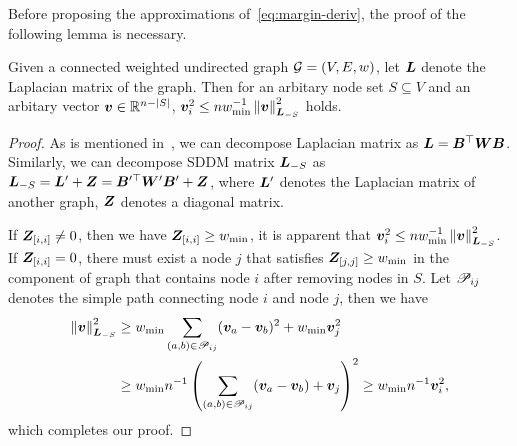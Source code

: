 \documentclass[sigconf]{acmart}
\begin{document}
Before proposing the approximations of~\eqref{eq:margin-deriv}, the proof of the following lemma is necessary.
\begin{lemma}\label{lem:norm-ineq}
  Given a connected weighted undirected graph \(\mathcal{G}=(V,E,w)\), let \(\boldsymbol{L}\) denote the Laplacian matrix of the graph.
  Then for an arbitary node set \(S\subseteq V\) and an arbitary vector \(\boldsymbol{v}\in\mathbb{R}^{n-\left|S \right|}\), \(\boldsymbol{v}_i^2\le nw_{\min}^{-1}\left\Vert\boldsymbol{v}\right\Vert^2_{\boldsymbol{L}_{-S}}\) holds.
\end{lemma}

\begin{proof}
  As is mentioned in~, we can decompose Laplacian matrix as \(\boldsymbol{L}=\boldsymbol{B}^\top\boldsymbol{W}\boldsymbol{B}\).
  Similarly, we can decompose SDDM matrix \(\boldsymbol{L}_{-S}\) as \(\boldsymbol{L}_{-S}=\boldsymbol{L}'+\boldsymbol{Z}=\boldsymbol{B}'^\top\boldsymbol{W}'\boldsymbol{B}'+\boldsymbol{Z}\), where \(\boldsymbol{L}'\) denotes the Laplacian matrix of another graph, \(\boldsymbol{Z}\) denotes a diagonal matrix.

  If \(\boldsymbol{Z}_{[i,i]}\neq0\), then we have \(\boldsymbol{Z}_{[i,i]}\ge w_{\min}\), it is apparent that \(\boldsymbol{v}_i^2\le nw_{\min}^{-1}\left\Vert\boldsymbol{v}\right\Vert^2_{\boldsymbol{L}_{-S}}\).
  If \(\boldsymbol{Z}_{[i,i]}=0\), there must exist a node \(j\) that satisfies \(\boldsymbol{Z}_{[j,j]}\ge w_{\min}\) in the component of graph that contains node \(i\) after removing nodes in \(S\).
  Let \(\mathscr{P}_{ij}\) denotes the simple path connecting node \(i\) and node \(j\), then we have
  \begin{align*}
    \left\Vert\boldsymbol{v}\right\Vert^2_{\boldsymbol{L}_{-S}}
     & \ge w_{\min}\sum_{\left( a,b \right)\in\mathscr{P}_{ij}}(\boldsymbol{v}_a-\boldsymbol{v}_b)^2+w_{\min}\boldsymbol{v}_j^2     \\
     & \ge w_{\min}n^{-1}\left( \sum_{\left( a,b \right)\in\mathscr{P}_{ij}}(\boldsymbol{v}_a-\boldsymbol{v}_b)+\boldsymbol{v}_j \right)^2
    \ge w_{\min}n^{-1}\boldsymbol{v}_i^2,
  \end{align*}
  which completes our proof.
\end{proof}
\end{document}

